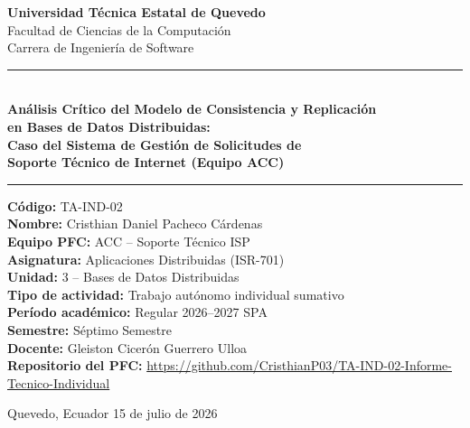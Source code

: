 \documentclass[12pt, a4paper]{article}
\begin{document}
\begin{titlepage}
\centering
\vspace*{0.5cm}
{\large\bfseries Universidad Técnica Estatal de Quevedo}\\[6pt]
{\normalsize Facultad de Ciencias de la Computación}\\[4pt]
{\normalsize Carrera de Ingeniería de Software}

\vspace{1cm}
\rule{\linewidth}{1pt}\\[10pt]
{\Large\bfseries
  Análisis Crítico del Modelo de Consistencia y Replicación\\[4pt]
  en Bases de Datos Distribuidas:\\[4pt]
  Caso del Sistema de Gestión de Solicitudes de\\[4pt]
  Soporte Técnico de Internet (Equipo ACC)
}
\vspace{2pt}
\rule{\linewidth}{1pt}

\vspace{1.2cm}
{\normalsize
  \textbf{Código:} TA-IND-02\\[4pt]
  \textbf{Nombre:} Cristhian Daniel Pacheco Cárdenas\\[4pt]
  \textbf{Equipo PFC:} ACC -- Soporte Técnico ISP\\[4pt]
  \textbf{Asignatura:} Aplicaciones Distribuidas (ISR-701)\\[4pt]
  \textbf{Unidad:} 3 -- Bases de Datos Distribuidas\\[4pt]
  \textbf{Tipo de actividad:} Trabajo autónomo individual sumativo\\[4pt]
  \textbf{Período académico:} Regular 2026--2027 SPA\\[4pt]
  \textbf{Semestre:} Séptimo Semestre\\[4pt]
  \textbf{Docente:} Gleiston Cicerón Guerrero Ulloa\\[4pt]
  \textbf{Repositorio del PFC:} \url{https://github.com/CristhianP03/TA-IND-02-Informe-Tecnico-Individual}
}

\vspace{2.2cm}
{\small Quevedo, Ecuador \textperiodcentered{} 15 de julio de 2026}
\end{titlepage}

\pagestyle{fancy}

\tableofcontents
\clearpage
\end{document}
